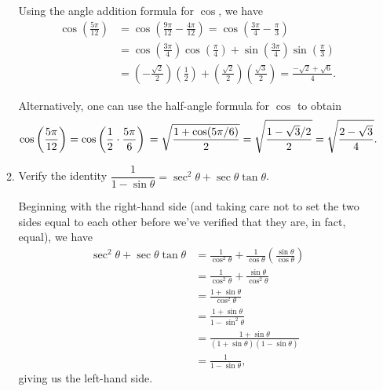 \documentclass[12pt]{article}
\newcommand{\points}[1]{\marginpar{\hspace{24pt}[#1]}}
\begin{document}
\begin{enumerate}
\begin{enumerate}
Using the angle addition formula for $\cos$, we have
\begin{align*}
 \cos\left(\frac{5\pi}{12}\right) & = \cos\left(\frac{9\pi}{12}-\frac{4\pi}{12}\right) = \cos\left(\frac{3\pi}{4}-\frac{\pi}{3}\right)\\
& = \cos\left(\frac{3\pi}{4}\right)\cos\left(\frac{\pi}{4}\right)+\sin\left(\frac{3\pi}{4}\right)\sin\left(\frac{\pi}{3}\right)\\
& = \left(-\frac{\sqrt{2}}{2}\right)\left(\frac{1}{2}\right) + \left(\frac{\sqrt{2}}{2}\right)\left(\frac{\sqrt{3}}{2}\right) = \frac{-\sqrt{2}+\sqrt{6}}{4}.
\end{align*}

\medskip

Alternatively, one can use the half-angle formula for $\cos$ to obtain
\[
 \cos\left(\frac{5\pi}{12}\right)  = \cos\left(\frac{1}{2}\cdot \frac{5\pi}{6}\right)\\
 = \sqrt{\frac{1+\cos(5\pi/6)}{2}} = \sqrt{\frac{1-\sqrt{3}/2}{2}} = \sqrt{\frac{2-\sqrt{3}}{4}}.
\]

\bigskip



\item Verify the identity $\dfrac{1}{1-\sin\theta} = \sec^2\theta+\sec\theta\tan\theta$. \points{4}

\bigskip

Beginning with the right-hand side (and taking care not to set the two sides equal to each other before we've verified that they are, in fact, equal), we have
\begin{align*}
 \sec^2\theta+\sec\theta\tan\theta & = \frac{1}{\cos^2\theta}+\frac{1}{\cos\theta}\left(\frac{\sin\theta}{\cos\theta}\right)\\
& = \frac{1}{\cos^2\theta}+\frac{\sin\theta}{\cos^2\theta}\\
& = \frac{1+\sin\theta}{\cos^2\theta}\\
& = \frac{1+\sin\theta}{1-\sin^2\theta}\\
& = \frac{1+\sin\theta}{(1+\sin\theta)(1-\sin\theta)}\\
& = \frac{1}{1-\sin\theta},
\end{align*}
giving us the left-hand side.
      \end{enumerate}


\end{enumerate}
\end{document}
